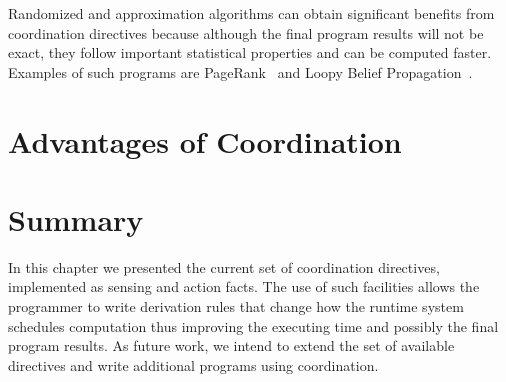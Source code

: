 Randomized and approximation algorithms can obtain significant benefits from
coordination directives because although the final program results will not be
exact, they follow important statistical properties and can be computed faster.
Examples of such programs are PageRank~\cite{Lubachevsky:1986:CAA:4904.4801} and
Loopy Belief Propagation~\cite{Gonzalez+al:aistats09paraml}.

\section{Advantages of Coordination}

\section{Summary}

In this chapter we presented the current set of coordination directives,
implemented as sensing and action facts. The use of such facilities allows the
programmer to write derivation rules that change how the runtime system
schedules computation thus improving the executing time and possibly the final
program results. As future work, we intend to extend the set of available
directives and write additional programs using coordination.
